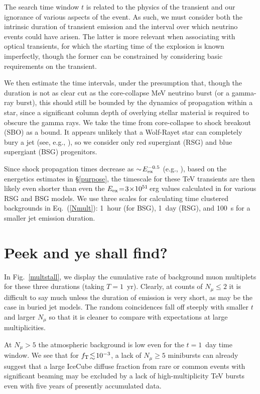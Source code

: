 \documentclass[aps,prd,nofootinbib,twocolumn,floatfix,letterpaper,superscriptaddress,showpacs]{revtex4}
\begin{document}
The search time window $t$ is related to the physics of the transient and our ignorance of various aspects of the event.  As such, we must consider both the intrinsic duration of transient emission and the interval over which neutrino events could have arisen.  The latter is more relevant when associating with optical transients, for which the starting time of the explosion is known imperfectly, though the former can be constrained by considering basic requirements on the transient.



We then estimate the time intervals, under the presumption that, though the duration is not as clear cut as the core-collapse MeV neutrino burst (or a gamma-ray burst), this should still be bounded by the dynamics of propagation within a star, since a significant column depth of overlying stellar material is required to obscure the gamma rays.  We take the time from core-collapse to shock breakout (SBO) as a bound.  It appears unlikely that a Wolf-Rayet star can completely bury a jet (see, e.g., \cite{Murase2013b}), so we consider only red supergiant (RSG) and blue supergiant (BSG) progenitors.

Since shock propagation times decrease as $\sim\! E_{\rm ex}^{-0.5}$ (e.g., \cite{Matzner:1998mg}), based on the energetics estimates in \S\ref{purpose}, the timescale for these TeV transients are then likely even shorter than even the $E_{\rm ex} \!=\! 3 \!\times\! 10^{51}\,$erg values calculated in \cite{Kistler2013} for various RSG and BSG models.  We use three scales for calculating time clustered backgrounds in Eq.~(\ref{Nmult}): 1~hour (for BSG), 1~day (RSG), and 100~s for a smaller jet emission duration.



\section{Peek and ye shall find?}
%
In Fig.~\ref{multstall}, we display the cumulative rate of background muon multiplets for these three durations (taking $T \!=\! 1$~yr).
Clearly, at counts of $N_\mu \! \leq\! 2$ it is difficult to say much unless the duration of emission is very short, as may be the case in buried jet models.
The random coincidences fall off steeply with smaller $t$ and larger $N_\mu$ so that it is cleaner to compare with expectations at large multiplicities.

At $N_\mu \!>\! 5$ the atmospheric background is low even for the $t \!=\!1$~day time window.
We see that for $f_{\rm T} \!\lesssim\! 10^{-3}$, a lack of $N_\mu \!\ge\! 5$ minibursts can already suggest that a large IceCube diffuse fraction from rare or common events with significant beaming may be excluded by a lack of high-multiplicity TeV bursts even with five years of presently accumulated data.
\end{document}
